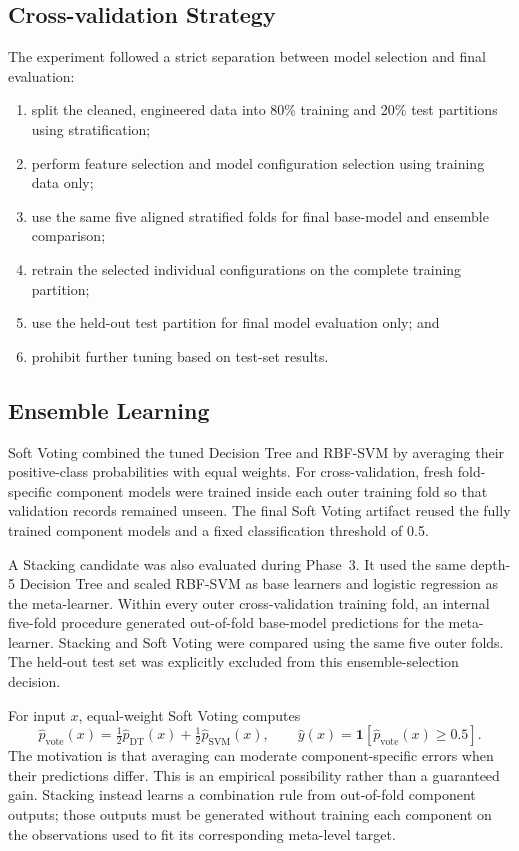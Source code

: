 \documentclass[11pt,a4paper]{article}
\begin{document}
\subsection{Cross-validation Strategy}

The experiment followed a strict separation between model selection and final evaluation:
\begin{enumerate}
    \item split the cleaned, engineered data into 80\% training and 20\% test partitions using stratification;
    \item perform feature selection and model configuration selection using training data only;
    \item use the same five aligned stratified folds for final base-model and ensemble comparison;
    \item retrain the selected individual configurations on the complete training partition;
    \item use the held-out test partition for final model evaluation only; and
    \item prohibit further tuning based on test-set results.
\end{enumerate}

\subsection{Ensemble Learning}

Soft Voting combined the tuned Decision Tree and RBF-SVM by averaging their positive-class probabilities with equal weights. For cross-validation, fresh fold-specific component models were trained inside each outer training fold so that validation records remained unseen. The final Soft Voting artifact reused the fully trained component models and a fixed classification threshold of 0.5.

A Stacking candidate was also evaluated during Phase~3. It used the same depth-5 Decision Tree and scaled RBF-SVM as base learners and logistic regression as the meta-learner. Within every outer cross-validation training fold, an internal five-fold procedure generated out-of-fold base-model predictions for the meta-learner. Stacking and Soft Voting were compared using the same five outer folds. The held-out test set was explicitly excluded from this ensemble-selection decision.

For input $x$, equal-weight Soft Voting computes
\[
\widehat p_{\mathrm{vote}}(x)=\tfrac12\widehat p_{\mathrm{DT}}(x)+\tfrac12\widehat p_{\mathrm{SVM}}(x),\qquad
\widehat y(x)=\mathbf{1}[\widehat p_{\mathrm{vote}}(x)\geq0.5].
\]
The motivation is that averaging can moderate component-specific errors when their predictions differ. This is an empirical possibility rather than a guaranteed gain. Stacking instead learns a combination rule from out-of-fold component outputs; those outputs must be generated without training each component on the observations used to fit its corresponding meta-level target.
\end{document}

